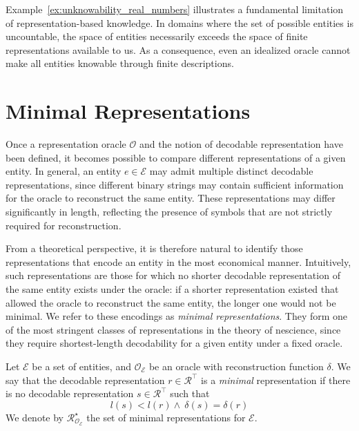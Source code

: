 Example~\ref{ex:unknowability_real_numbers} illustrates a fundamental limitation of representation-based knowledge. In domains where the set of possible entities is uncountable, the space of entities necessarily exceeds the space of finite representations available to us. As a consequence, even an idealized oracle cannot make all entities knowable through finite descriptions.

%
%

\section{Minimal Representations}

Once a representation oracle $\mathcal{O}$ and the notion of decodable representation have been defined, it becomes possible to compare different representations of a given entity. In general, an entity $e \in \mathcal{E}$ may admit multiple distinct decodable representations, since different binary strings may contain sufficient information for the oracle to reconstruct the same entity. These representations may differ significantly in length, reflecting the presence of symbols that are not strictly required for reconstruction.

From a theoretical perspective, it is therefore natural to identify those representations that encode an entity in the most economical manner. Intuitively, such representations are those for which no shorter decodable representation of the same entity exists under the oracle: if a shorter representation existed that allowed the oracle to reconstruct the same entity, the longer one would not be minimal. We refer to these encodings as \emph{minimal representations}. They form one of the most stringent classes of representations in the theory of nescience, since they require shortest-length decodability for a given entity under a fixed oracle.

\begin{definition}
\label{def:nonredundant_description}
Let $\mathcal{E}$ be a set of entities, and $\mathcal{O}_\mathcal{E}$ be an oracle with reconstruction function $\delta$. We say that the decodable representation $r \in \mathcal{R}^{\top}$ is a \emph{minimal} representation if there is no decodable representation $s\in\mathcal{R}^{\top}$ such that
\[
l(s) < l(r) \wedge\ \delta(s) = \delta(r)
\]
We denote by $\mathcal{R}^{\star}_{\mathcal{O}_{\mathcal{E}}}$ the set of minimal representations for $\mathcal{E}$.
\end{definition}

